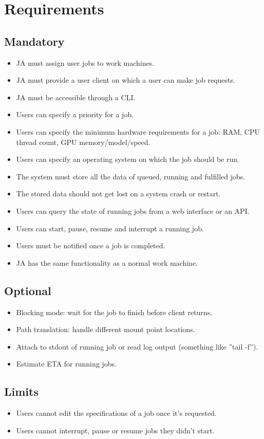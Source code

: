 \section{Requirements}

\subsection{Mandatory}
\begin{itemize}
\item JA must assign user jobs to work machines.
 \item JA must provide a user client on which a user can make job requests.
\item JA must be accessible through a CLI.
\item Users can specify a priority for a job.
\item Users can specify the minimum hardware requirements for a job: RAM, CPU thread count, GPU memory/model/speed.
\item Users can specify an operating system on which the job should be run.
\item The system must store all the data of queued, running and fulfilled jobs.
\item The stored data should not get lost on a system crash or restart.
\item Users can query the state of running jobs from a web interface or an API.
\item Users can start, pause, resume and interrupt a running job.
\item Users must be notified once a job is completed.
\item JA has the same functionality as a normal work machine.
\end{itemize}

\subsection{Optional}
\begin{itemize}
\item Blocking mode: wait for the job to finish before client returns.
\item Path translation: handle different mount point locations.
\item Attach to stdout of running job or read log output (something like ”tail
-f”).
\item Estimate ETA for running jobs.
\end{itemize}

\subsection{Limits}
\begin{itemize}
\item Users cannot edit the specifications of a job once it's requested.
\item Users cannot interrupt, pause or resume jobs they didn't start.
\end{itemize}
